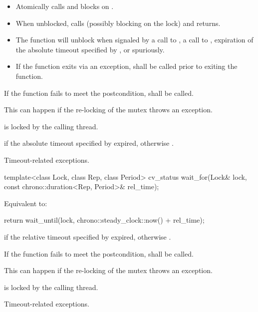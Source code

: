 \begin{itemdescr}
\pnum\effects

\begin{itemize}
\item
Atomically calls  and blocks on .

\item
When unblocked, calls  (possibly blocking on the lock) and returns.

\item
The function will unblock when signaled by a call to , a call to ,
expiration of the absolute timeout specified by ,
or spuriously.

\item
If the function exits via an exception,  shall be called prior to exiting the function.
\end{itemize}

\pnum
\remarks
If the function fails to meet the postcondition, 
shall be called.
\begin{note} This can happen if the re-locking of the mutex throws an exception. \end{note}

\pnum
\ensures {} is locked by the calling thread.

\pnum
\returns {} if
the absolute timeout specified by  expired,
otherwise .

\pnum
\throws Timeout-related
exceptions.

\end{itemdescr}

%
\begin{itemdecl}
template<class Lock, class Rep, class Period>
  cv_status wait_for(Lock& lock, const chrono::duration<Rep, Period>& rel_time);
\end{itemdecl}

\begin{itemdescr}
\pnum
\effects Equivalent to:
\begin{codeblock}
return wait_until(lock, chrono::steady_clock::now() + rel_time);
\end{codeblock}

\pnum
\returns {} if
the relative timeout specified by  expired,
otherwise .

\pnum
\remarks
If the function fails to meet the postcondition, 
shall be called.
\begin{note} This can happen if the re-locking of the mutex throws an exception. \end{note}

\pnum
\ensures {} is locked by the calling thread.

\pnum
\throws Timeout-related
exceptions.

\end{itemdescr}

